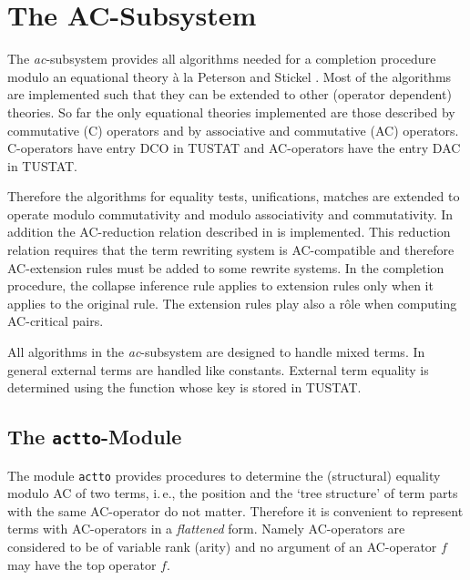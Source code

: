 \section{The AC-Subsystem} \label{se:ac}

The {\it ac}-subsystem provides all algorithms needed for a completion
procedure modulo an equational theory \`{a} la Peterson and Stickel
\cite{PetersonStickel:81}.
Most of the algorithms are implemented such that they can be extended to
other (operator dependent) theories.
So far the only equational theories  implemented are those described by 
commutative (C) operators and by
associative and commutative (AC) operators.
C-operators have entry DCO in TUSTAT and
AC-operators have the entry DAC in TUSTAT.

Therefore the algorithms for equality tests, unifications, matches are
extended to operate modulo commutativity and
modulo associativity and commutativity.
In addition the AC-reduction relation described in
\cite{PetersonStickel:81} is implemented.
This reduction relation requires that the term rewriting system is
AC-compatible and therefore AC-extension rules must be added to some 
rewrite systems.
In the completion procedure, the collapse inference rule applies to extension
rules only when it applies to the original rule.
The extension rules play also a r\^{o}le when computing AC-critical pairs.

All algorithms in the {\it ac}-subsystem are designed to handle mixed terms.
In general external terms are handled like constants.
External term equality is determined using the function whose key is stored
in TUSTAT.

\subsection{The {\tt actto}-Module}

The module {\tt actto} provides procedures to determine the (structural)
equality modulo AC of two terms,
i.\,e., the position and the `tree structure' of term parts with the same
AC-operator do not matter.
Therefore it is convenient to represent terms with AC-operators in a
{\em flattened} form.
Namely AC-operators are considered to be of variable rank (arity) and no
argument of an AC-operator  $f$ may have the top operator $f$.

